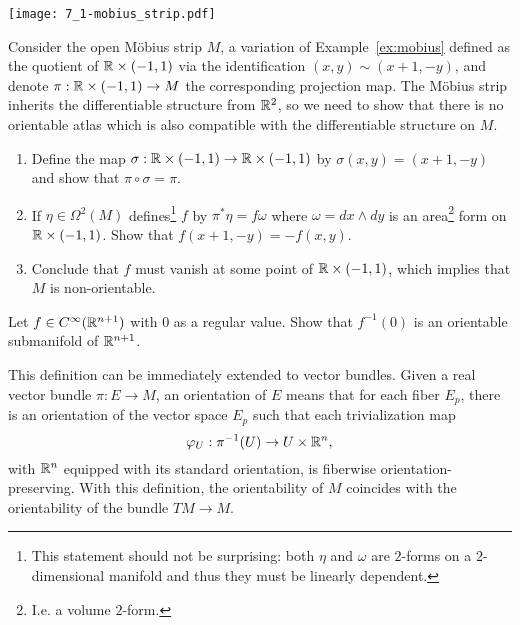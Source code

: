 \begin{marginfigure}
  \texttt{[image: 7\_1-mobius\_strip.pdf]}
\end{marginfigure}

\begin{exercise}
  Consider the open M\"obius strip $M$, a variation of Example~\ref{ex:mobius} defined as the quotient of $\mathbb{R}\times(-1,1)$ via the identification $(x,y) \sim (x+1, -y)$, and denote $\pi: \mathbb{R}\times(-1,1)\to M$ the corresponding projection map.
  The M\"obius strip inherits the differentiable structure from $\mathbb{R}^2$, so we need to show that there is no orientable atlas which is also compatible with the differentiable structure on $M$.
  \begin{enumerate}
    \item Define the map $\sigma:\mathbb{R}\times(-1,1)\to\mathbb{R}\times(-1,1)$ by $\sigma(x,y) = (x+1, -y)$ and show that $\pi\circ\sigma = \pi$.
    \item If $\eta\in\Omega^2(M)$ defines\footnote{This statement should not be surprising: both $\eta$ and $\omega$ are $2$-forms on a $2$-dimensional manifold and thus they must be linearly dependent.} $f$ by $\pi^* \eta = f \omega$ where $\omega = dx\wedge dy$ is an area\footnote{I.e. a volume $2$-form.} form on $\mathbb{R}\times(-1,1)$.
          Show that $f(x+1, -y) = - f(x,y)$.
    \item Conclude that $f$ must vanish at some point of $\mathbb{R}\times(-1,1)$, which implies that $M$ is non-orientable.
  \end{enumerate}
\end{exercise}

\begin{exercise}
  Let $f\in C^\infty(\mathbb{R}^{n+1})$ with $0$ as a regular value.
  Show that $f^{-1}(0)$ is an orientable submanifold of $\mathbb{R}^{n+1}$.
\end{exercise}

\begin{remark}
  This definition can be immediately extended to vector bundles.
  Given a real vector bundle $\pi: E \to M$, an orientation of $E$ means that for each fiber $E_p$, there is an orientation of the vector space $E_p$ such that each trivialization map
  \begin{equation}
    \varphi_{U}:\pi^{-1}(U)\to U\times \mathbb{R}^{n},
  \end{equation}
  with $\mathbb{R}^n$ equipped with its standard orientation, is fiberwise orientation-preserving.
  With this definition, the orientability of $M$ coincides with the orientability of the bundle $TM\to M$.
\end{remark}

